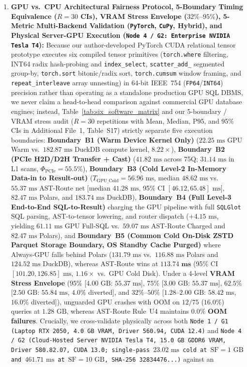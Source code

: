 \documentclass[10pt,a4paper]{article}
\begin{document}
\begin{enumerate}[leftmargin=1.5em,itemsep=0.8pt]
    \item \textbf{GPU vs.\ CPU Architectural Fairness Protocol, 5-Boundary Timing Equivalence ($R=30$ CIs), VRAM Stress Envelope ($32\%\text{--}95\%$), 5-Metric Multi-Backend Validation (\texttt{PyTorch}, \texttt{CuPy}, Hybrid), and Physical Server-GPU Execution (\texttt{Node 4 /\allowbreak{} G2: Enterprise NVIDIA Tesla~T4}):} Because our author-developed PyTorch CUDA relational tensor prototype executes six compiled tensor primitives (\texttt{torch.where} filtering, INT64 radix hash-probing and \texttt{index\_select}, \texttt{scatter\_add\_} segmented group-by, \texttt{torch.sort} bitonic/radix sort, \texttt{torch.cumsum} window framing, and \texttt{repeat\_interleave} array unnesting) in 64-bit IEEE~754 (\texttt{FP64}/\texttt{INT64}) precision rather than operating as a standalone production GPU SQL DBMS, we never claim a head-to-head comparison against commercial GPU database engines; instead, Table~\ref{tab:six_software_matrix} and our 5-boundary / VRAM stress audit ($R=30$ repetitions with Mean, Median, P95, and 95\% CIs in Additional File~1, Table~S17) strictly separate five execution boundaries: \textbf{Boundary~B1 (Warm Device Kernel Only)} ($22.25\text{ ms}$ GPU Warm vs.\ $182.87\text{ ms}$ DuckDB compute kernel, $8.22\times$), \textbf{Boundary~B2 (PCIe H2D/D2H Transfer + Cast)} ($41.82\text{ ms}$ across 75Q; $31.14\text{ ms}$ in L1 scans, $\Phi_{\text{PCIe}}=55.5\%$), \textbf{Boundary~B3 (Cold Level-2 In-Memory Data-in to Result-out)} ($T_{\text{GPU\_Cold}} = 56.96\text{ ms}$, median $48.62\text{ ms}$ vs.\ $55.37\text{ ms}$ AST-Route net [median $41.28\text{ ms}$, 95\% CI $[46.12,65.48]\text{ ms}$], $82.47\text{ ms}$ Polars, and $183.74\text{ ms}$ DuckDB), \textbf{Boundary~B4 (Full Level-3 End-to-End SQL-to-Result)} charging the GPU pipeline with full \texttt{SQLGlot} SQL parsing, AST-to-tensor lowering, and router dispatch ($+4.15\text{ ms}$, yielding $61.11\text{ ms}$ GPU Full-SQL vs.\ $59.07\text{ ms}$ AST-Route Charged and $82.47\text{ ms}$ Polars), and \textbf{Boundary~B5 (Common Cold On-Disk ZSTD Parquet Storage Boundary, OS Standby Cache Purged)} where Always-GPU falls behind Polars ($131.79\text{ ms}$ vs.\ $116.88\text{ ms}$ Polars and $124.52\text{ ms}$ DuckDB), whereas AST-Route wins at $\mathbf{113.74\text{ ms}}$ (95\% CI $[101.20,126.85]\text{ ms}$, $1.16\times$ vs.\ GPU Cold Disk). Under a 4-level \textbf{VRAM Stress Envelope} ($95\%$ [$4.00\text{ GB}$: $55.37\text{ ms}$], $75\%$ [$3.00\text{ GB}$: $55.37\text{ ms}$], $62.5\%$ [$2.50\text{ GB}$: $55.84\text{ ms}$, $4.0\%$ diverted], and $32\%\text{--}50\%$ [$1.28\text{--}2.00\text{ GB}$: $58.42\text{ ms}$, $16.0\%$ diverted]), unguarded GPU crashes with OOM on $12/75$ ($16.0\%$) queries at $1.28\text{ GB}$, whereas AST-Route Rule~U4 maintains $\mathbf{0.0\%}$ \textbf{OOM failures}. Crucially, we cross-validate physically across both \texttt{Node~1 /\allowbreak{} G1 (Laptop RTX~2050, 4.0~GB VRAM, Driver 560.94, CUDA 12.4)} and \texttt{Node~4 / G2 (Cloud-Hosted Server NVIDIA Tesla~T4, 15.0~GB GDDR6 VRAM, Driver 580.82.07, CUDA 13.0; single-pass $23.02\text{ ms}$ cold at $\text{SF}=1\text{ GB}$ and $461.71\text{ ms}$ at $\text{SF}=10\text{ GB}$, SHA-256 \texttt{32834476...})} against an 
\end{enumerate}
\end{document}
